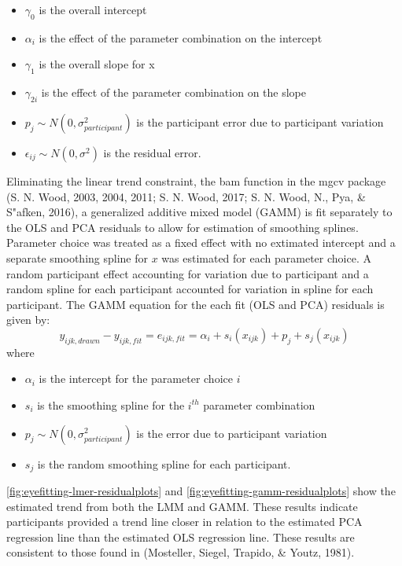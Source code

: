 \documentclass[print]{nuthesis}
\providecommand{\tightlist}{%
  \setlength{\itemsep}{0pt}\setlength{\parskip}{0pt}}
\begin{document}
\begin{itemize}
\tightlist
\item
  \(\gamma_0\) is the overall intercept
\item
  \(\alpha_i\) is the effect of the parameter combination on the intercept
\item
  \(\gamma_1\) is the overall slope for x
\item
  \(\gamma_{2i}\) is the effect of the parameter combination on the slope
\item
  \(p_{j} \sim N(0, \sigma^2_{participant})\) is the participant error due to participant variation
\item
  \(\epsilon_{ij} \sim N(0, \sigma^2)\) is the residual error.
\end{itemize}

Eliminating the linear trend constraint, the bam function in the mgcv package (S. N. Wood, 2003, 2004, 2011; S. N. Wood, 2017; S. N. Wood, N., Pya, \& S"afken, 2016), a generalized additive mixed model (GAMM) is fit separately to the OLS and PCA residuals to allow for estimation of smoothing splines.
Parameter choice was treated as a fixed effect with no extimated intercept and a separate smoothing spline for \(x\) was estimated for each parameter choice. A random participant effect accounting for variation due to participant and a random spline for each participant accounted for variation in spline for each participant.
The GAMM equation for the each fit (OLS and PCA) residuals is given by:
\begin{equation}
y_{ijk, drawn} - y_{ijk, fit} = e_{ijk,fit} = \alpha_i + s_{i}(x_{ijk}) + p_{j} + s_{j}(x_{ijk})
\end{equation}
\noindent where

\begin{itemize}
\tightlist
\item
  \(\alpha_i\) is the intercept for the parameter choice \(i\)
\item
  \(s_{i}\) is the smoothing spline for the \(i^{th}\) parameter combination
\item
  \(p_{j} \sim N(0, \sigma^2_{participant})\) is the error due to participant variation
\item
  \(s_{j}\) is the random smoothing spline for each participant.
\end{itemize}

\cref{fig:eyefitting-lmer-residualplots} and \cref{fig:eyefitting-gamm-residualplots} show the estimated trend from both the LMM and GAMM.
These results indicate participants provided a trend line closer in relation to the estimated PCA regression line than the estimated OLS regression line. These results are consistent to those found in (Mosteller, Siegel, Trapido, \& Youtz, 1981).
\end{document}
